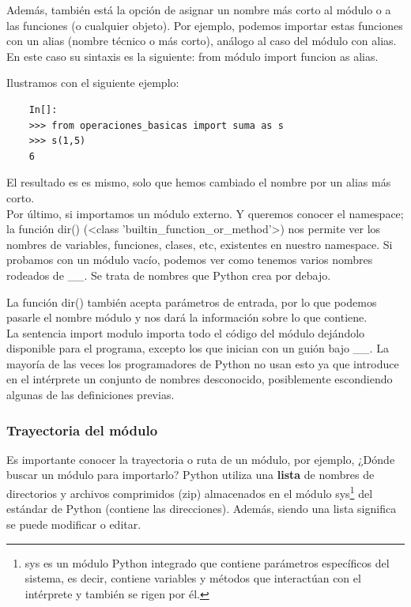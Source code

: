 Además, también está la opción de asignar un nombre más corto al módulo o a las funciones (o cualquier objeto). Por ejemplo, podemos importar estas funciones con un alias (nombre técnico o  más corto), análogo al caso del módulo con alias. En este caso su sintaxis es la siguiente: {\ttfamily from módulo import funcion as alias}.

Ilustramos con el siguiente ejemplo:
\begin{lstlisting}
	In[]:
	>>> from operaciones_basicas import suma as s
	>>> s(1,5)
	6
\end{lstlisting}
El resultado es es mismo, solo que hemos cambiado el nombre por un alias más corto.\\

Por último, si importamos un módulo externo. Y queremos conocer el namespace; la función {\ttfamily dir()} ({\ttfamily <class {}'{}builtin\_function\_or\_method{}'{}>{}}) nos permite ver los nombres de variables, funciones, clases, etc, existentes en nuestro namespace. Si probamos con un módulo vacío, podemos ver como tenemos varios nombres rodeados de {\ttfamily\_\!\_}. Se trata de nombres que Python crea por debajo.

La función {\ttfamily dir()} también acepta parámetros de entrada, por lo que podemos pasarle el nombre módulo y nos dará la información sobre lo que contiene.\\

La sentencia {\ttfamily import modulo} importa todo el código  del módulo dejándolo  disponible para el programa, excepto los que inician con un guión bajo {\ttfamily\_\!\_}. La mayoría de las veces los programadores de Python no usan esto ya que introduce en el intérprete un conjunto de nombres desconocido, posiblemente escondiendo algunas de las definiciones previas.


\subsubsection{Trayectoria del módulo}



Es importante conocer la trayectoria o ruta de un módulo, por ejemplo, ¿Dónde buscar un módulo para 
importarlo? Python utiliza una {\bf lista} de nombres de directorios y archivos comprimidos ({\ttfamily zip}) almacenados en el
módulo {\ttfamily sys}\footnote{sys es un módulo Python integrado que contiene parámetros específicos del sistema, es decir, contiene variables y métodos que interactúan con el intérprete y también se rigen por él.} del estándar de Python (contiene las direcciones). 
Además, siendo una lista  significa  se puede modificar o editar.

